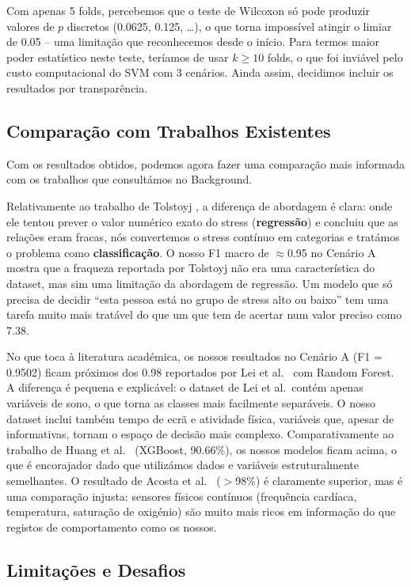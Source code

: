 \documentclass[12pt,a4paper]{article}
\begin{document}
Com apenas 5 folds, percebemos que o teste de Wilcoxon só pode produzir valores de $p$
discretos (0.0625, 0.125, \ldots), o que torna impossível atingir o limiar de 0.05 --
uma limitação que reconhecemos desde o início. Para termos maior poder estatístico neste
teste, teríamos de usar $k \geq 10$ folds, o que foi inviável pelo custo computacional
do SVM com 3 cenários. Ainda assim, decidimos incluir os resultados por transparência.

\subsection{Comparação com Trabalhos Existentes}

Com os resultados obtidos, podemos agora fazer uma comparação mais informada com os
trabalhos que consultámos no Background.

Relativamente ao trabalho de Tolstoyj \cite{tolstoyj2024}, a diferença de abordagem
é clara: onde ele tentou prever o valor numérico exato do stress (\textbf{regressão})
e concluiu que as relações eram fracas, nós convertemos o stress contínuo em categorias
e tratámos o problema como \textbf{classificação}. O nosso F1 macro de $\approx$0.95
no Cenário A mostra que a fraqueza reportada por Tolstoyj não era uma característica
do dataset, mas sim uma limitação da abordagem de regressão. Um modelo que só precisa
de decidir ``esta pessoa está no grupo de stress alto ou baixo'' tem uma tarefa muito
mais tratável do que um que tem de acertar num valor preciso como 7.38.

No que toca à literatura académica, os nossos resultados no Cenário A (F1 = 0.9502)
ficam próximos dos 0.98 reportados por Lei et al.\ \cite{lei2024} com Random Forest.
A diferença é pequena e explicável: o dataset de Lei et al.\ contém apenas variáveis
de sono, o que torna as classes mais facilmente separáveis. O nosso dataset inclui
também tempo de ecrã e atividade física, variáveis que, apesar de informativas,
tornam o espaço de decisão mais complexo.
Comparativamente ao trabalho de Huang et al.\ \cite{huang2024} (XGBoost, 90.66\%),
os nossos modelos ficam acima, o que é encorajador dado que utilizámos dados e
variáveis estruturalmente semelhantes.
O resultado de Acosta et al.\ \cite{acosta2025} ($>$98\%) é claramente superior,
mas é uma comparação injusta: sensores físicos contínuos (frequência cardíaca,
temperatura, saturação de oxigénio) são muito mais ricos em informação do que
registos de comportamento como os nossos.

\subsection{Limitações e Desafios}
\end{document}
